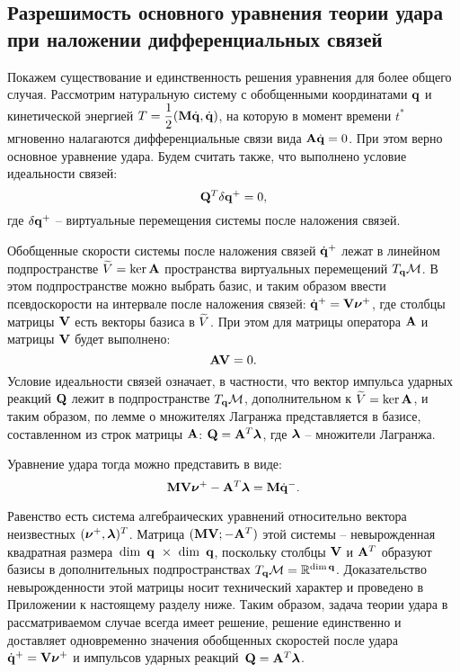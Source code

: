 
\subsection{Разрешимость основного уравнения теории удара при наложении дифференциальных связей}

Покажем существование и единственность решения уравнения для более общего случая.
Рассмотрим натуральную систему с обобщенными координатами $\mathbf{q}$ и кинетической энергией $T = \displaystyle\frac{\displaystyle 1}{\displaystyle 2}(\mathbf{M}\dot{\mathbf{q}}, \dot{\mathbf{q}})$, на которую в момент времени $t^*$ мгновенно налагаются дифференциальные связи вида $\mathbf{A}\dot{\mathbf{q}} = 0$.
При этом верно основное уравнение удара.
Будем считать также, что выполнено условие идеальности связей:
\begin{equation}\label{eq:constraints_ideal}
    \mathbf{Q}^T \delta\mathbf{q}^+ = 0,
\end{equation}
где $\delta\mathbf{q}^+$ -- виртуальные перемещения системы после наложения связей.

Обобщенные скорости системы после наложения связей $\dot{\mathbf{q}}^+$ лежат в линейном подпространстве $\widetilde{V} = \ker \mathbf{A}$ пространства виртуальных перемещений $T_{\mathbf{q}}\mathcal{M}$.
В этом подпространстве можно выбрать базис, и таким образом ввести псевдоскорости на интервале после наложения связей: $\dot{\mathbf{q}}^+ = \mathbf{V}\boldsymbol{\mathbf{\nu}}^+$, где столбцы матрицы $\mathbf{V}$ есть векторы базиса в $\widetilde{V}$.
При этом для матрицы оператора $\mathbf{A}$ и матрицы $\mathbf{V}$ будет выполнено:
\begin{equation}\label{eq:constraints_orth}
    \mathbf{A}\mathbf{V} = 0.
\end{equation}
Условие идеальности связей означает, в частности, что вектор импульса ударных реакций $\mathbf{Q}$ лежит в подпространстве $T_{\mathbf{q}}\mathcal{M}$, дополнительном к $\widetilde{V} = \ker \mathbf{A}$, и таким образом, по лемме о множителях Лагранжа \cite{KarapetyanKugushev2010} представляется в базисе, составленном из строк матрицы $\mathbf{A}$: $\mathbf{Q} = \mathbf{A}^T\boldsymbol{\mathbf{\lambda}}$, где $\boldsymbol{\mathbf{\lambda}}$ -- множители Лагранжа.

Уравнение удара тогда можно представить в виде:
\begin{equation}\label{eq:udar_mat_At}
    \mathbf{M}\mathbf{V}\boldsymbol{\mathbf{\nu}}^+ - \mathbf{A}^T\boldsymbol{\mathbf{\lambda}} = \mathbf{M}\dot{\mathbf{q}}^-.
\end{equation}

Равенство есть система алгебраических уравнений относительно вектора неизвестных $(\boldsymbol{\mathbf{\nu}}^+, \boldsymbol{\mathbf{\lambda}})^T$. Матрица $(\mathbf{M}\mathbf{V}; -\mathbf{A}^T)$ этой системы -- невырожденная квадратная размера~$\dim~\mathbf{q}~\times~\dim~\mathbf{q}$, поскольку столбцы $\mathbf{V}$ и $\mathbf{A}^T$ образуют базисы в дополнительных подпространствах $T_{\mathbf{q}}\mathcal{M} = \mathbb{R}^{\dim \mathbf{q}}$. Доказательство невырожденности этой матрицы носит технический характер и проведено в Приложении к настоящему разделу ниже. Таким образом, задача теории удара в рассматриваемом случае всегда имеет решение, решение единственно и доставляет одновременно значения обобщенных скоростей после удара $\dot{\mathbf{q}}^+ = \mathbf{V}\boldsymbol{\mathbf{\nu}}^+$ и импульсов ударных реакций~$\mathbf{Q} = \mathbf{A}^T\boldsymbol{\mathbf{\lambda}}$.

